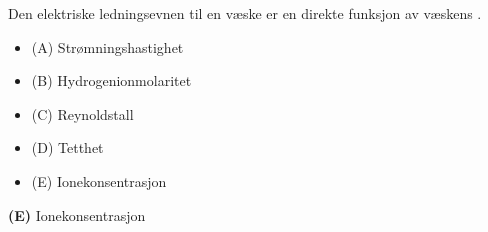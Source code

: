 

Den elektriske ledningsevnen til en væske er en direkte funksjon av væskens \underbar{\hskip 50pt}.

\begin{itemize}
\item{(A)} Strømningshastighet
\vskip 5pt 
\item{(B)} Hydrogenionmolaritet
\vskip 5pt 
\item{(C)} Reynoldstall
\vskip 5pt 
\item{(D)} Tetthet
\vskip 5pt 
\item{(E)} Ionekonsentrasjon
\end{itemize}







{\bf (E)} Ionekonsentrasjon
 








